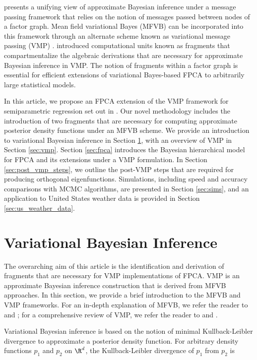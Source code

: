 \documentclass[12pt]{article}
\theoremstyle{plain}
\theoremstyle{definition}
\theoremstyle{remark}
\begin{document}
 presents a unifying view of approximate Bayesian inference under a message passing framework
that relies on the notion of messages passed between nodes of a factor graph. Mean field variational Bayes (MFVB)
can be incorporated into this framework through an alternate scheme known as variational message passing (VMP)
\cite{winn05}.  introduced computational units known as fragments that compartmentalize
the algebraic derivations that are necessary for approximate Bayesian inference in VMP. The notion of fragments
within a factor graph is essential for efficient extensions of variational Bayes-based FPCA to arbitrarily large statistical
models.

In this article, we propose an FPCA extension of the VMP framework for semiparametric regression set out in
. Our novel methodology includes the introduction of two fragments  that are necessary for
computing approximate posterior density functions under an MFVB scheme. We provide an introduction to
variational Bayesian inference in Section \ref{sec:vbi}, with an overview of VMP in Section \ref{sec:vmp}.
Section \ref{sec:fpca} introduces the Bayesian hierarchical model for FPCA and its extensions under a
VMP formulation. In Section \ref{sec:post_vmp_steps}, we outline the post-VMP steps that are required for
producing orthogonal eigenfunctions. Simulations, including speed and accuracy comparisons with MCMC
algorithms, are presented in Section \ref{sec:sims}, and an application to United States weather data is
provided in Section \ref{sec:us_weather_data}.


\section{Variational Bayesian Inference}
\label{sec:vbi}

The overarching aim of this article is the identification and derivation of fragments that are necessary for VMP
implementations of FPCA. VMP is an approximate Bayesian inference construction that is derived from MFVB
approaches. In this section, we provide a brief introduction to the MFVB and VMP frameworks. For an in-depth
explanation of MFVB, we refer the reader to  and ; for a comprehensive review
of VMP, we refer the reader to  and .

Variational Bayesian inference is based on the notion of minimal Kullback-Leibler divergence to approximate a
posterior density function. For arbitrary density functions $p_1$
and $p_2$ on $\R^d$, the Kullback-Leibler divergence of $p_1$ from $p_2$ is
\end{document}
